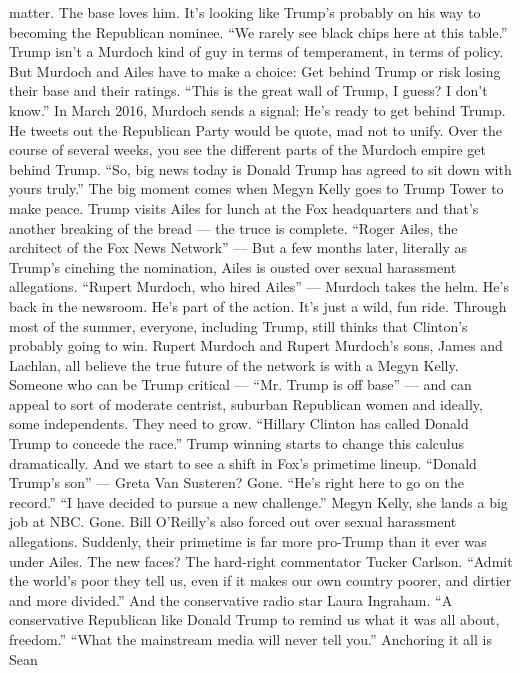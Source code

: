 \begin{itemize}
  matter. The base loves him. It's looking like Trump's probably on his
  way to becoming the Republican nominee. ``We rarely see black chips
  here at this table.'' Trump isn't a Murdoch kind of guy in terms of
  temperament, in terms of policy. But Murdoch and Ailes have to make a
  choice: Get behind Trump or risk losing their base and their ratings.
  ``This is the great wall of Trump, I guess? I don't know.'' In March
  2016, Murdoch sends a signal: He's ready to get behind Trump. He
  tweets out the Republican Party would be quote, mad not to unify. Over
  the course of several weeks, you see the different parts of the
  Murdoch empire get behind Trump. ``So, big news today is Donald Trump
  has agreed to sit down with yours truly.'' The big moment comes when
  Megyn Kelly goes to Trump Tower to make peace. Trump visits Ailes for
  lunch at the Fox headquarters and that's another breaking of the bread
  --- the truce is complete. ``Roger Ailes, the architect of the Fox
  News Network'' --- But a few months later, literally as Trump's
  cinching the nomination, Ailes is ousted over sexual harassment
  allegations. ``Rupert Murdoch, who hired Ailes'' --- Murdoch takes the
  helm. He's back in the newsroom. He's part of the action. It's just a
  wild, fun ride. Through most of the summer, everyone, including Trump,
  still thinks that Clinton's probably going to win. Rupert Murdoch and
  Rupert Murdoch's sons, James and Lachlan, all believe the true future
  of the network is with a Megyn Kelly. Someone who can be Trump
  critical --- ``Mr. Trump is off base'' --- and can appeal to sort of
  moderate centrist, suburban Republican women and ideally, some
  independents. They need to grow. ``Hillary Clinton has called Donald
  Trump to concede the race.'' Trump winning starts to change this
  calculus dramatically. And we start to see a shift in Fox's primetime
  lineup. ``Donald Trump's son'' --- Greta Van Susteren? Gone. ``He's
  right here to go on the record.'' ``I have decided to pursue a new
  challenge.'' Megyn Kelly, she lands a big job at NBC. Gone. Bill
  O'Reilly's also forced out over sexual harassment allegations.
  Suddenly, their primetime is far more pro-Trump than it ever was under
  Ailes. The new faces? The hard-right commentator Tucker Carlson.
  ``Admit the world's poor they tell us, even if it makes our own
  country poorer, and dirtier and more divided.'' And the conservative
  radio star Laura Ingraham. ``A conservative Republican like Donald
  Trump to remind us what it was all about, freedom.'' ``What the
  mainstream media will never tell you.'' Anchoring it all is Sean

\end{itemize}
